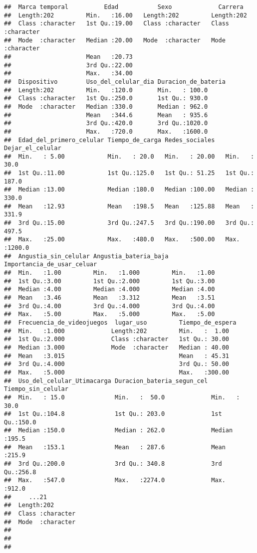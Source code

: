 \documentclass[
]{article}
\begin{document}
\begin{verbatim}
##  Marca temporal          Edad           Sexo             Carrera         
##  Length:202         Min.   :16.00   Length:202         Length:202        
##  Class :character   1st Qu.:19.00   Class :character   Class :character  
##  Mode  :character   Median :20.00   Mode  :character   Mode  :character  
##                     Mean   :20.73                                        
##                     3rd Qu.:22.00                                        
##                     Max.   :34.00                                        
##  Dispositivo        Uso_del_celular_dia Duracion_de_bateria
##  Length:202         Min.   :120.0       Min.   : 100.0     
##  Class :character   1st Qu.:250.0       1st Qu.: 930.0     
##  Mode  :character   Median :330.0       Median : 962.0     
##                     Mean   :344.6       Mean   : 935.6     
##                     3rd Qu.:420.0       3rd Qu.:1020.0     
##                     Max.   :720.0       Max.   :1600.0     
##  Edad_del_primero_celular Tiempo_de_carga Redes_sociales   Dejar_el_celular
##  Min.   : 5.00            Min.   : 20.0   Min.   : 20.00   Min.   :  30.0  
##  1st Qu.:11.00            1st Qu.:125.0   1st Qu.: 51.25   1st Qu.: 187.0  
##  Median :13.00            Median :180.0   Median :100.00   Median : 330.0  
##  Mean   :12.93            Mean   :198.5   Mean   :125.88   Mean   : 331.9  
##  3rd Qu.:15.00            3rd Qu.:247.5   3rd Qu.:190.00   3rd Qu.: 497.5  
##  Max.   :25.00            Max.   :480.0   Max.   :500.00   Max.   :1200.0  
##  Angustia_sin_celular Angustia_bateria_baja Importancia_de_usar_celuar
##  Min.   :1.00         Min.   :1.000         Min.   :1.00              
##  1st Qu.:3.00         1st Qu.:2.000         1st Qu.:3.00              
##  Median :4.00         Median :4.000         Median :4.00              
##  Mean   :3.46         Mean   :3.312         Mean   :3.51              
##  3rd Qu.:4.00         3rd Qu.:4.000         3rd Qu.:4.00              
##  Max.   :5.00         Max.   :5.000         Max.   :5.00              
##  Frecuencia_de_videojuegos  lugar_uso         Tiempo_de_espera
##  Min.   :1.000             Length:202         Min.   :  1.00  
##  1st Qu.:2.000             Class :character   1st Qu.: 30.00  
##  Median :3.000             Mode  :character   Median : 40.00  
##  Mean   :3.015                                Mean   : 45.31  
##  3rd Qu.:4.000                                3rd Qu.: 50.00  
##  Max.   :5.000                                Max.   :300.00  
##  Uso_del_celular_Utimacarga Duracion_bateria_segun_cel Tiempo_sin_celular
##  Min.   : 15.0              Min.   :  50.0             Min.   : 30.0     
##  1st Qu.:104.8              1st Qu.: 203.0             1st Qu.:150.0     
##  Median :150.0              Median : 262.0             Median :195.5     
##  Mean   :153.1              Mean   : 287.6             Mean   :215.9     
##  3rd Qu.:200.0              3rd Qu.: 340.8             3rd Qu.:256.8     
##  Max.   :547.0              Max.   :2274.0             Max.   :912.0     
##     ...21          
##  Length:202        
##  Class :character  
##  Mode  :character  
##                    
##                    
## 
\end{verbatim}
\end{document}
